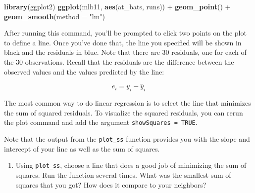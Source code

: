 \documentclass[]{book}
\newenvironment{Shaded}{\begin{snugshade}}{\end{snugshade}}
\newcommand{\KeywordTok}[1]{\textcolor[rgb]{0.13,0.29,0.53}{\textbf{{#1}}}}
\newcommand{\DataTypeTok}[1]{\textcolor[rgb]{0.13,0.29,0.53}{{#1}}}
\newcommand{\StringTok}[1]{\textcolor[rgb]{0.31,0.60,0.02}{{#1}}}
\newcommand{\OtherTok}[1]{\textcolor[rgb]{0.56,0.35,0.01}{{#1}}}
\newcommand{\NormalTok}[1]{{#1}}
\providecommand{\tightlist}{%
  \setlength{\itemsep}{0pt}\setlength{\parskip}{0pt}}
\theoremstyle{definition}
\theoremstyle{definition}
\theoremstyle{remark}
\begin{document}
\begin{Shaded}
\end{Shaded}

\begin{Shaded}
\begin{Highlighting}[]
\KeywordTok{library}\NormalTok{(ggplot2)}
\KeywordTok{ggplot}\NormalTok{(mlb11, }\KeywordTok{aes}\NormalTok{(at_bats, runs)) +}\StringTok{ }\KeywordTok{geom_point}\NormalTok{() +}\StringTok{ }\KeywordTok{geom_smooth}\NormalTok{(}\DataTypeTok{method =} \StringTok{"lm"}\NormalTok{)}
\end{Highlighting}
\end{Shaded}

After running this command, you'll be prompted to click two points on
the plot to define a line. Once you've done that, the line you specified
will be shown in black and the residuals in blue. Note that there are 30
residuals, one for each of the 30 observations. Recall that the
residuals are the difference between the observed values and the values
predicted by the line:

\[
  e_i = y_i - \hat{y}_i
\]

The most common way to do linear regression is to select the line that
minimizes the sum of squared residuals. To visualize the squared
residuals, you can rerun the plot command and add the argument
\texttt{showSquares\ =\ TRUE}.

\begin{Shaded}
\end{Shaded}

Note that the output from the \texttt{plot\_ss} function provides you
with the slope and intercept of your line as well as the sum of squares.

\begin{enumerate}
\def\labelenumi{\arabic{enumi}.}
\setcounter{enumi}{2}
\tightlist
\item
  Using \texttt{plot\_ss}, choose a line that does a good job of
  minimizing the sum of squares. Run the function several times. What
  was the smallest sum of squares that you got? How does it compare to
  your neighbors?
\end{enumerate}
\end{document}
